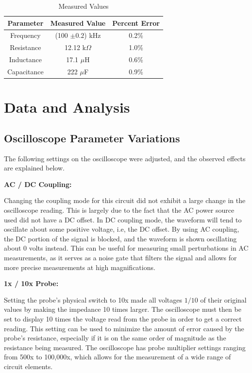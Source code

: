 \documentclass[twocolumn,english]{IEEEtran}
\theoremstyle{plain}
\theoremstyle{plain}
\begin{document}
\begin{table}[h!]
\centering{}
\caption{Measured Values}
\label{tb:parameter_error}
\begin{tabular}{|c|c|c|}
\hline
\textbf{Parameter}	&\textbf{Measured Value}	&\textbf{Percent Error}	\\ \hline
Frequency		& (100 $\pm 0.2$) kHz		&0.2\%		\\ \hline
{Resistance}		& 12.12 k$\Omega$  		&1.0\% 		\\ \hline
{Inductance}		& 17.1 $\mu$H   		&0.6\% 		\\ \hline
{Capacitance}		& 222 $\mu$F  			&0.9\%		\\ \hline
\end{tabular}
\end{table}

\section{Data and Analysis}
\subsection{Oscilloscope Parameter Variations}
The following settings on the oscilloscope were adjusted, and the observed effects are explained below.

\noindent\textbf{AC / DC Coupling: }

Changing the coupling mode for this circuit did not exhibit a large change in the oscilloscope reading. This is largely due to the fact that the AC power source used did not have a DC offset. In DC coupling mode, the waveform will tend to oscillate about some positive voltage, i.e, the DC offset. By using AC coupling, the DC portion of the signal is blocked, and the waveform is shown oscillating about 0 volts instead. This can be useful for measuring small perturbations in AC measurements, as it serves as a noise gate that filters the signal and allows for more precise measurements at high magnifications.

\noindent\textbf{1x / 10x Probe: }

Setting the probe's physical switch to 10x made all voltages $1/10$ of their original values by making the impedance 10 times larger. The oscilloscope must then be set to display 10 times the voltage read from the probe in order to get a correct reading. This setting can be used to minimize the amount of error caused by the probe's resistance, especially if it is on the same order of magnitude as the resistance being measured. The oscilloscope has probe multiplier settings ranging from 500x to 100,000x, which allows for the measurement of a wide range of circuit elements.
\end{document}

